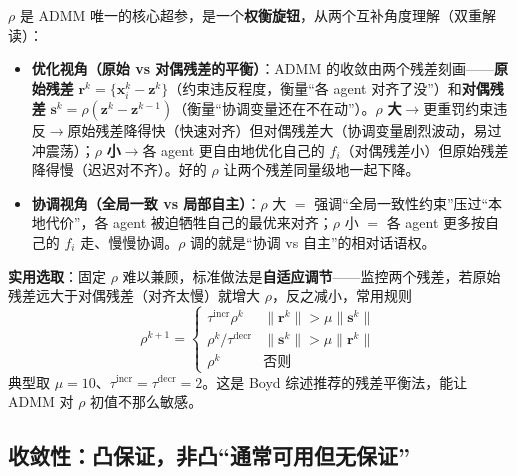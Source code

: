 $\rho$ 是 ADMM 唯一的核心超参，是一个\textbf{权衡旋钮}，从两个互补角度理解（双重解读）：
\begin{itemize}
  \item \textbf{优化视角（原始 vs 对偶残差的平衡）}：ADMM 的收敛由两个残差刻画——\textbf{原始残差} $\mathbf{r}^k=\{\mathbf{x}_i^k-\mathbf{z}^k\}$（约束违反程度，衡量“各 agent 对齐了没”）和\textbf{对偶残差} $\mathbf{s}^k=\rho(\mathbf{z}^k-\mathbf{z}^{k-1})$（衡量“协调变量还在不在动”）。$\rho$ \textbf{大}$\to$更重罚约束违反$\to$原始残差降得快（快速对齐）但对偶残差大（协调变量剧烈波动，易过冲震荡）；$\rho$ \textbf{小}$\to$各 agent 更自由地优化自己的 $f_i$（对偶残差小）但原始残差降得慢（迟迟对不齐）。好的 $\rho$ 让两个残差同量级地一起下降。
  \item \textbf{协调视角（全局一致 vs 局部自主）}：$\rho$ 大 $=$ 强调“全局一致性约束”压过“本地代价”，各 agent 被迫牺牲自己的最优来对齐；$\rho$ 小 $=$ 各 agent 更多按自己的 $f_i$ 走、慢慢协调。$\rho$ 调的就是“协调 vs 自主”的相对话语权。
\end{itemize}
\textbf{实用选取}：固定 $\rho$ 难以兼顾，标准做法是\textbf{自适应调节}——监控两个残差，若原始残差远大于对偶残差（对齐太慢）就增大 $\rho$，反之减小，常用规则
\begin{equation}
  \rho^{k+1}=\begin{cases}\tau^{\text{incr}}\rho^k & \|\mathbf{r}^k\|>\mu\|\mathbf{s}^k\|\\[2pt]\rho^k/\tau^{\text{decr}} & \|\mathbf{s}^k\|>\mu\|\mathbf{r}^k\|\\[2pt]\rho^k&\text{否则}\end{cases}
  \label{eq:cs-rho-adapt}
\end{equation}
典型取 $\mu=10$、$\tau^{\text{incr}}=\tau^{\text{decr}}=2$。这是 Boyd 综述推荐的残差平衡法，能让 ADMM 对 $\rho$ 初值不那么敏感\cite{boyd2011admm}。

\subsection{收敛性：凸保证，非凸“通常可用但无保证”}
\label{sec:cs-admm-conv}

